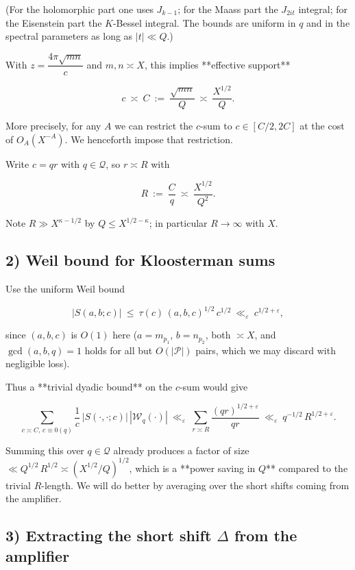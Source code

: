 \documentclass[11pt]{article}
\theoremstyle{definition}
\theoremstyle{remark}
\begin{document}
(For the holomorphic part one uses $J_{k-1}$; for the Maass part the $J_{2it}$ integral; for the Eisenstein part the $K$-Bessel integral. The bounds are uniform in $q$ and in the spectral parameters as long as $|t|\ll Q$.)

With $z=\dfrac{4\pi\sqrt{m n}}{c}$ and $m,n\asymp X$, this implies **effective support**

$$
c\ \asymp\ C\ :=\ \frac{\sqrt{mn}}{Q}\ \asymp\ \frac{X^{1/2}}{Q}.
$$

More precisely, for any $A$ we can restrict the $c$-sum to $c\in[C/2,2C]$ at the cost of $O_A(X^{-A})$. We henceforth impose that restriction.

Write $c=qr$ with $q\in\mathcal Q$, so $r\asymp R$ with

$$
R\ :=\ \frac{C}{q}\ \asymp\ \frac{X^{1/2}}{Q^2}.
$$

Note $R\gg X^{\kappa-1/2}$ by $Q\le X^{1/2-\kappa}$; in particular $R\to\infty$ with $X$.

\subsection*{2) Weil bound for Kloosterman sums}

Use the uniform Weil bound

$$
|S(a,b;c)|\ \le\ \tau(c)\,(a,b,c)^{1/2}\,c^{1/2}\ \ll_\varepsilon\ c^{1/2+\varepsilon},
$$

since $(a,b,c)$ is $O(1)$ here ($a=m_{p_1}$, $b=n_{p_2}$, both $\asymp X$, and $\gcd(a,b,q)=1$ holds for all but $O(|\mathcal P|)$ pairs, which we may discard with negligible loss).

Thus a **trivial dyadic bound** on the $c$-sum would give

$$
\sum_{c\asymp C,\, c\equiv 0(q)} \frac{1}{c}\,|S(\cdot,\cdot;c)|\,|\mathcal W_q(\cdot)|\ \ll_\varepsilon\ \sum_{r\asymp R} \frac{(qr)^{1/2+\varepsilon}}{qr}\ \ll_\varepsilon\ q^{-1/2}\,R^{1/2+\varepsilon}.
$$

Summing this over $q\in\mathcal Q$ already produces a factor of size $\ll Q^{1/2}\,R^{1/2}\asymp (X^{1/2}/Q)^{1/2}$, which is a **power saving in $Q$** compared to the trivial $R$-length. We will do better by averaging over the short shifts coming from the amplifier.

\subsection*{3) Extracting the short shift $\Delta$ from the amplifier}
\end{document}
